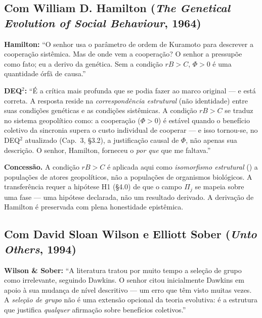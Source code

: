 \subsection{Com William D. Hamilton (\emph{The Genetical Evolution of
Social Behaviour}, 1964)}\label{con-hamilton-1964}

\textbf{Hamilton:} ``O senhor usa o par\^{a}metro de ordem de Kuramoto
para descrever a coopera\c{c}\~{a}o sist\^{e}mica. Mas de onde vem a
coopera\c{c}\~{a}o? O senhor a pressup\~{o}e como fato; eu a derivo da
gen\'{e}tica. Sem a condi\c{c}\~{a}o $rB > C$, $\Phi > 0$ \'{e} uma
quantidade \'{o}rf\~{a} de causa.''

\textbf{DEQ$^2$:} ``\'{E} a cr\'{i}tica mais profunda que se podia fazer
ao marco original --- e est\'{a} correta. A resposta reside na
\emph{correspond\^{e}ncia estrutural} (n\~{a}o identidade) entre suas
condi\c{c}\~{o}es gen\'{e}ticas e as condi\c{c}\~{o}es sist\^{e}micas.
A condi\c{c}\~{a}o $rB > C$ se traduz no sistema geopol\'{i}tico como:
a coopera\c{c}\~{a}o ($\Phi > 0$) \'{e} est\'{a}vel quando o benef\'{i}cio
coletivo da sincronia supera o custo individual de cooperar --- e isso
tornou-se, no DEQ$^2$ atualizado (Cap.~3, §3.2), a justifica\c{c}\~{a}o
causal de $\Phi$, n\~{a}o apenas sua descri\c{c}\~{a}o. O senhor,
Hamilton, forneceu o \emph{por que} que me faltava.''

\textbf{Concess\~{a}o.} A condi\c{c}\~{a}o $rB > C$ \'{e} aplicada aqui
como \emph{isomorfismo estrutural} (\Hypoth{}) a popula\c{c}\~{o}es de
atores geopol\'{i}ticos, n\~{a}o a popula\c{c}\~{o}es de organismos
biol\'{o}gicos. A transfer\^{e}ncia requer a hip\'{o}tese H1 (§4.0) de
que o campo $\Pi_j$ se mapeia sobre uma fase --- uma hip\'{o}tese
declarada, n\~{a}o um resultado derivado. A deriva\c{c}\~{a}o de Hamilton
\'{e} preservada com plena honestidade epist\^{e}mica.

\subsection{Com David Sloan Wilson e Elliott Sober (\emph{Unto Others},
1994)}\label{con-wilson-sober-1994}

\textbf{Wilson \& Sober:} ``A literatura tratou por muito tempo a
sele\c{c}\~{a}o de grupo como irrelevante, seguindo Dawkins. O senhor
citou inicialmente Dawkins em apoio \`{a} sua mudan\c{c}a de n\'{i}vel
descritivo --- um erro que t\^{e}m visto muitas vezes. A \emph{sele\c{c}\~{a}o
de grupo} n\~{a}o \'{e} uma extens\~{a}o opcional da teoria evolutiva:
\'{e} a estrutura que justifica \emph{qualquer} afirma\c{c}\~{a}o sobre
benef\'{i}cios coletivos.''


